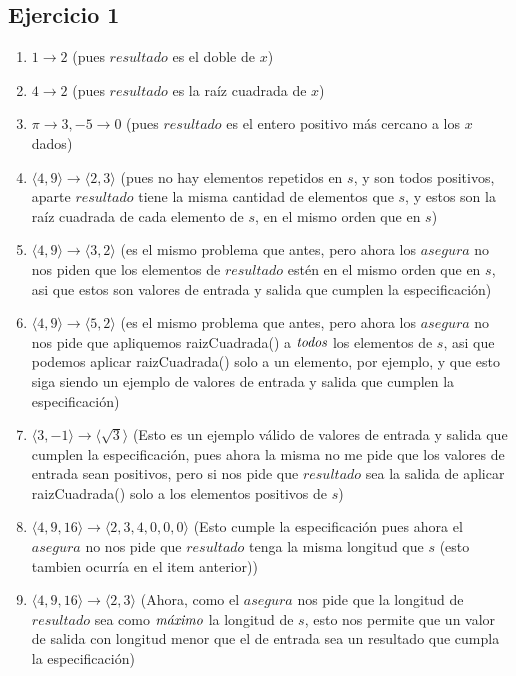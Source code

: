 	\subsection{Ejercicio 1}
	\begin{enumerate}[label=(\alph*)]
	\item $1 \rightarrow 2$ (pues $resultado$ es el doble de $x$)
	\item $4 \rightarrow 2$ (pues $resultado$ es la raíz cuadrada de $x$)
	\item $\pi \rightarrow 3, -5 \rightarrow 0$ (pues $resultado$ es el entero positivo más cercano a los $x$ dados)
	\item $\langle 4,9 \rangle \rightarrow \langle 2,3 \rangle$ (pues no hay elementos repetidos en $s$, y son todos positivos, aparte $resultado$ tiene la misma cantidad de elementos que $s$, y estos son la raíz cuadrada de cada elemento de $s$, en el mismo orden que en $s$)
	\item $\langle 4,9 \rangle \rightarrow \langle 3,2 \rangle$ (es el mismo problema que antes, pero ahora los $asegura$ no nos piden que los elementos de $resultado$ estén en el mismo orden que en $s$, asi que estos son valores de entrada y salida que cumplen la especificación)
	\item $\langle 4,9 \rangle \rightarrow \langle 5,2 \rangle$ (es el mismo problema que antes, pero ahora los $asegura$ no nos pide que apliquemos raizCuadrada() a $\emph{todos}$ los elementos de $s$, asi que podemos aplicar raizCuadrada() solo a un elemento, por ejemplo, y que esto siga siendo un ejemplo de valores de entrada y salida que cumplen la especificación)
	\item $\langle 3,-1 \rangle \rightarrow \langle \sqrt{3} \rangle$ (Esto es un ejemplo válido de valores de entrada y salida que cumplen la especificación, pues ahora la misma no me pide que los valores de entrada sean positivos, pero si nos pide que $resultado$ sea la salida de aplicar raizCuadrada() solo a los elementos positivos de $s$)
	\item $\langle 4,9,16 \rangle \rightarrow \langle 2,3,4,0,0,0 \rangle$ (Esto cumple la especificación pues ahora el $asegura$ no nos pide que $resultado$ tenga la misma longitud que $s$ (esto tambien ocurría en el item anterior))
	\item $\langle 4,9,16 \rangle \rightarrow \langle 2,3 \rangle$ (Ahora, como el $asegura$ nos pide que la longitud de $resultado$ sea como $\emph{máximo}$ la longitud de $s$, esto nos permite que un valor de salida con longitud menor que el de entrada sea un resultado que cumpla la especificación)
	\end{enumerate}
	
